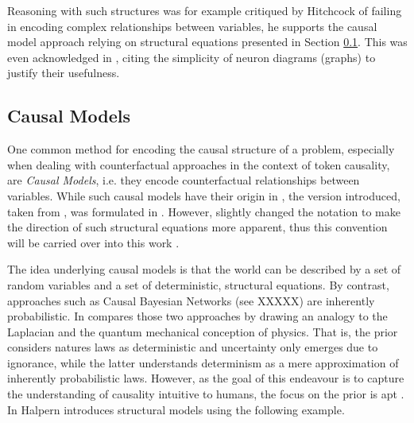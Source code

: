 \documentclass[11pt,a4paper]{book}
\theoremstyle{definition}
\theoremstyle{definition}
\theoremstyle{definition}
\theoremstyle{remark}
\begin{document}
Reasoning with such structures was for example critiqued by Hitchcock \cite{hitchcock2009structural} of failing in encoding complex relationships between variables, he supports the causal model approach relying on structural equations presented in Section  \ref{sec:causal_models}. 
This was even acknowledged in \cite{erwig2010causal}, citing the simplicity of neuron diagrams (graphs) to justify their usefulness. 







\subsection{Causal Models}
\label{sec:causal_models}
One common method for encoding the causal structure of a problem, especially when dealing with counterfactual approaches in the context of token causality, are \emph{Causal Models}, i.e. they encode counterfactual relationships between variables. While such causal models have their origin in \cite{pearl1995causal}, the version introduced, taken from \cite{halpern2015cause}, was formulated in \cite{halpern2000axiomatizing}. However, \cite{Weslake2015partialtheory} slightly changed the notation to make the direction of such structural equations more apparent, thus this convention will be carried over into this work \cite{halpern2015cause,Weslake2015partialtheory}. 


The idea underlying causal models is that the world can be described by a set of random variables and a set of deterministic, structural equations. 
By contrast, approaches such as Causal Bayesian Networks (see XXXXX) are inherently probabilistic. In  \cite{pearl2009causality} compares those two approaches by drawing an analogy to the Laplacian and the quantum mechanical conception of physics. That is, the prior considers natures laws as deterministic and uncertainty only emerges due to ignorance, while the latter understands determinism as a mere approximation of inherently probabilistic laws.
However, as the goal of this endeavour is to capture the understanding of causality intuitive to humans, the focus on the prior is apt \cite{pearl2009causality}. 
In \cite{halpern2015cause} Halpern introduces structural models using the following example.
\end{document}
